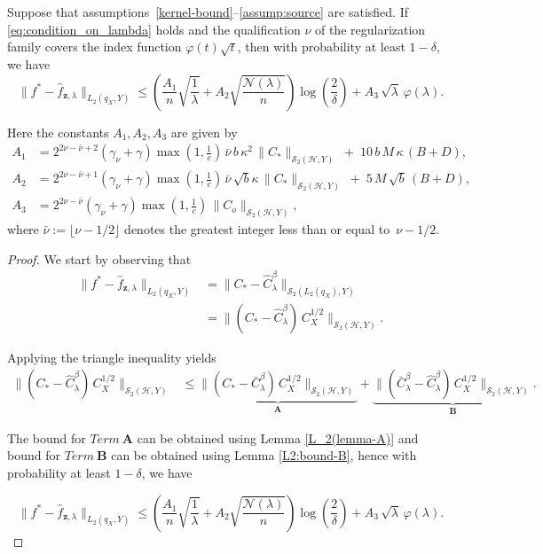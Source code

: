 \documentclass[twoside,11pt]{article}
\begin{document}
\begin{theorem}\label{Main-Theorem L2}
 Suppose that {assumptions~\ref{kernel-bound}--\ref{assump:source}} are satisfied.
If \eqref{eq:condition_on_lambda} holds and the qualification $\nu$ of the regularization family covers the index function \(\varphi(t)\sqrt{t}\),
then with probability at least \(1-\delta\), we have
\[
\big\|f^*-\widehat{f}_{\textbf{z},\lambda} \big\|_{{L}_2(q_X,Y)}\leq \left(
\frac{A_1}{n}\sqrt{\frac{1}{\lambda}}
+ A_2\sqrt{\frac{\mathcal{N}(\lambda)}{n}}
\right) \log\left(\frac{2}{\delta}\right)
+ A_3\,\sqrt{\lambda}\,\varphi(\lambda).
\]


Here the constants $A_1,A_2,A_3$ are given by 
\begin{align*}
A_1
&= 2^{2\nu-\bar \nu+2}(\gamma_\nu+\gamma)\max\!\left(1,\frac{1}{c}\right)
\,\bar \nu\, b\,\kappa^{2}\,\|C_{*}\|_{\mathcal S_2(\mathcal H,Y)}
\;+\; 10\,b\,M\,\kappa\,(B+D), \\[6pt]
A_2
&= 2^{2\nu-\bar \nu+1}(\gamma_\nu+\gamma)\max\!\left(1,\frac{1}{c}\right)
\,\bar \nu\, \sqrt{b}\kappa\,\|C_{*}\|_{\mathcal S_2(\mathcal H,Y)}
\;+\; 5\,M\,\sqrt{b}\,(B+D), \\[6pt]
A_3
&= 2^{2\nu-\bar \nu}(\gamma_\nu+\gamma)\max\!\left(1,\frac{1}{c}\right)
\,\|C_{o}\|_{\mathcal S_2(\mathcal H,Y)},
\end{align*}
where $\bar{\nu} := \lfloor \nu -1/2 \rfloor$ denotes the greatest integer
less than or equal to~$\nu -1/2$.
\end{theorem}

\begin{proof}
    \noindent
We start by observing that
\begin{align*}
\big\|f^*-\widehat{f}_{\textbf{z},\lambda}\big\|_{{L}_2(q_X,Y)}
&=
\big\|C_*-\widehat{C}_{\lambda}^\beta \big\|_{\mathcal S_2( L_2(q_X),Y)} \\
&=
\big\|(C_*-\widehat{C}_{\lambda}^\beta)\, C_X^{1/2} \big\|_{\mathcal S_2(\mathcal H,Y)} .
\end{align*}


Applying the triangle inequality yields
\begin{align*}
\big\|(C_*-\widehat{C}_{\lambda}^\beta)\, C_X^{1/2} \big\|_{\mathcal S_2(\mathcal H,Y)}
&\leq
\underbrace{\big\|(C_*-\bar{C}_{\lambda}^\beta)\, C_X^{1/2} \big\|_{\mathcal S_2(\mathcal H,Y)}}_{\textbf{A}}  +
\underbrace{\big\|(\bar{C}_{\lambda}^\beta -\widehat{C}_\lambda^\beta)\, C_X^{1/2} \big\|_{\mathcal S_2(\mathcal H,Y)}}_{\textbf{B}} .
\end{align*}

\noindent
The bound for $Term ~ \textbf{A}$ can be obtained using Lemma \ref{L_2(lemma-A)} and bound for $Term~\textbf{B}$ can be obtained using Lemma \ref{L2:bound-B}, hence with probability at least $1-\delta$, we have

\[
 \big\|f^*-\widehat{f}_{\textbf{z},\lambda}\big\|_{{L}_2(q_X,Y)}\leq \left(
\frac{A_1}{n}\sqrt{\frac{1}{\lambda}}
+ A_2\sqrt{\frac{\mathcal{N}(\lambda)}{n}}
\right) \log\left(\frac{2}{\delta}\right)
+ A_3\,\sqrt{\lambda}\,\varphi(\lambda).
\]

\end{proof}
\end{document}
